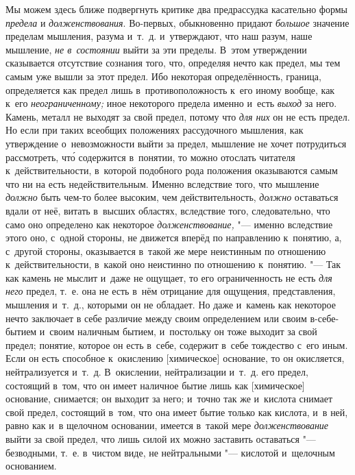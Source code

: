 Мы можем здесь ближе подвергнуть критике два предрассудка касательно формы
{\em предела} и {\em долженствования}. Во-первых, обыкновенно придают
{\em большое} значение пределам мышления, разума
и~т.~д. и~утверждают, что наш разум, наше мышление,
{\em не в~состоянии} выйти за эти пределы. В~этом
утверждении сказывается отсутствие сознания того, что, определяя нечто как предел,
мы тем самым уже вышли за этот предел. Ибо некоторая определённость, граница,
определяется как предел лишь в~противоположность к~его иному вообще, как
к~его {\em неограниченному;} иное некоторого предела
именно и~есть {\em выход} за него. Камень, металл не
выходят за свой предел, потому что {\em для них} он не
есть предел. Но если при таких всеобщих положениях рассудочного мышления,
как утверждение о~невозможности выйти за предел, мышление не хочет
потрудиться рассмотреть, чт\'{о} содержится в~понятии, то можно отослать
читателя к~действительности, в~которой подобного рода положения оказываются
самым что ни на есть недействительным. Именно вследствие того, что мышление
{\em должно} быть чем-то более высоким, чем
действительность, {\em должно} оставаться вдали от неё,
витать в~высших областях, вследствие того, следовательно, что само оно
определено как некоторое {\em долженствование,} "---
именно вследствие этого оно, с~одной стороны, не движется вперёд по
направлению к~понятию, а, с~другой стороны, оказывается в~такой же мере
неистинным по отношению к~действительности, в~какой оно неистинно по
отношению к~понятию. "--- Так как камень не мыслит и~даже не ощущает, то его
ограниченность не есть {\em для него} предел, т.~е. она
не есть в~нём отрицание для ощущения, представления, мышления и~т.~д.,
которыми он не обладает. Но даже и~камень как некоторое нечто заключает в
себе различие между своим определением или своим в-себе-бытием и~своим
наличным бытием, и~постольку он тоже выходит за свой предел; понятие,
которое он есть в~себе, содержит в~себе тождество с~его иным. Если он
есть способное к~окислению [химическое] основание, то он окисляется,
нейтрализуется и~т.~д. В~окислении, нейтрализации и~т.~д. его предел,
состоящий в~том, что он имеет наличное бытие лишь как [химическое]
основание, снимается; он выходит за него; и~точно так же и~кислота снимает
свой предел, состоящий в~том, что она имеет бытие только как кислота, и~в
ней, равно как и~в щелочном основании, имеется в~такой мере
{\em долженствование} выйти за свой предел, что лишь
силой их можно заставить оставаться "--- безводными, т.~е. в~чистом виде, не
нейтральными "--- кислотой и~щелочным основанием.

